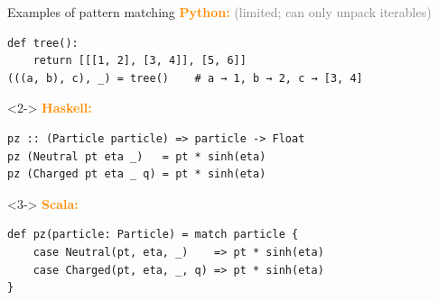 \documentclass[aspectratio=169]{beamer}
\begin{document}
\begin{frame}[fragile]{Examples of pattern matching}
\Large
\vspace{0.25 cm}
\textcolor{darkorange}{\bf Python:} \textcolor{gray}{(limited; can only unpack iterables)}

\begin{center}
\begin{minipage}{0.85\linewidth}
\normalsize
\begin{verbatim}
def tree():
    return [[[1, 2], [3, 4]], [5, 6]]
(((a, b), c), _) = tree()    # a → 1, b → 2, c → [3, 4]
\end{verbatim}
\end{minipage}
\end{center}

\vspace{0.35 cm}
\begin{uncoverenv}<2->
\textcolor{darkorange}{\bf Haskell:}

\begin{center}
\begin{minipage}{0.85\linewidth}
\normalsize
\begin{verbatim}
pz :: (Particle particle) => particle -> Float
pz (Neutral pt eta _)   = pt * sinh(eta)
pz (Charged pt eta _ q) = pt * sinh(eta)
\end{verbatim}
\end{minipage}
\end{center}
\end{uncoverenv}

\vspace{0.35 cm}
\begin{uncoverenv}<3->
\textcolor{darkorange}{\bf Scala:}

\begin{center}
\begin{minipage}{0.85\linewidth}
\normalsize
\begin{verbatim}
def pz(particle: Particle) = match particle {
    case Neutral(pt, eta, _)    => pt * sinh(eta)
    case Charged(pt, eta, _, q) => pt * sinh(eta)
}
\end{verbatim}
\end{minipage}
\end{center}
\end{uncoverenv}
\end{frame}
\end{document}
